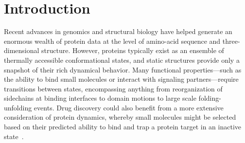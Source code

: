 \documentclass[aps,pre,twocolumn,nofootinbib,superscriptaddress,linenumbers]{revtex4-1}
\begin{document}
\maketitle

\section{Introduction}
\label{section:introduction}

Recent advances in genomics and structural biology have helped generate an enormous wealth of protein data at the level of amino-acid sequence and three-dimensional structure.
However, proteins typically exist as an ensemble of thermally accessible conformational states, and static structures provide only a snapshot of their rich dynamical behavior.
Many functional properties---such as the ability to bind small molecules or interact with signaling partners---require transitions between states, encompassing anything from reorganization of sidechains at binding interfaces to domain motions to large scale folding-unfolding events.
Drug discovery could also benefit from a more extensive consideration of protein dynamics, whereby small molecules might be selected based on their predicted ability to bind and trap a protein target in an inactive state~\cite{craik:science:2009:trapping-moving-targets}.
\end{document}
